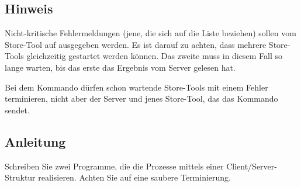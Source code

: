 \subsection*{Hinweis}

Nicht-kritische Fehlermeldungen (jene, die sich auf die Liste beziehen) sollen
vom Store-Tool auf  ausgegeben werden. Es ist darauf zu
achten, dass mehrere Store-Tools gleichzeitig gestartet werden können. Das
zweite muss in diesem Fall so lange warten, bis das erste das Ergebnis vom
Server gelesen hat.

Bei dem Kommando  dürfen schon wartende Store-Tools mit einem
Fehler terminieren, nicht aber der Server und jenes Store-Tool, das das Kommando
sendet.

\subsection*{Anleitung}

Schreiben Sie zwei Programme, die die Prozesse mittels einer
Client/Server-Struktur realisieren. Achten Sie auf eine saubere Terminierung.

\osueguidelinesthree


